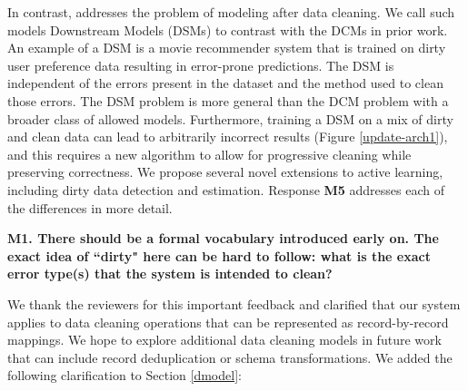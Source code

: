 
In contrast, \sys addresses the problem of modeling after data cleaning.
We call such models Downstream Models (DSMs) to contrast with the DCMs in prior work.
An example of a DSM is a movie recommender system that is trained on dirty user preference data resulting in error-prone predictions.
The DSM is independent of the errors present in the dataset and the method used to clean those errors.
The DSM problem is more general than the DCM problem with a broader class of allowed models.
Furthermore, training a DSM on a mix of dirty and clean data can lead to arbitrarily incorrect results (Figure \ref{update-arch1}), and this requires a new algorithm to allow for progressive cleaning while preserving correctness.
We propose several novel extensions to active learning, including dirty data detection and estimation.
Response \textbf{M5} addresses each of the differences in more detail.


\vspace{0.5em}

\noindent\noindent \textbf{M1. There should be a formal vocabulary introduced early on. The exact idea of ``dirty" here can be hard to follow: what is the exact error type(s) that the system is intended to clean?}

\vspace{0.5em}

We thank the reviewers for this important feedback and clarified that our system applies to data cleaning operations that can be represented as record-by-record mappings.
We hope to explore additional data cleaning models in future work that can include record deduplication or schema transformations.
We added the following clarification to Section \ref{dmodel}:

